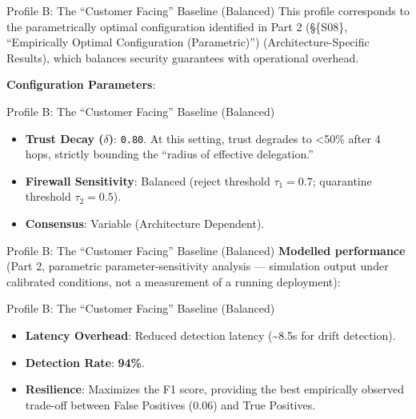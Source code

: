 \documentclass[
  ignorenonframetext,
]{beamer}
\providecommand{\tightlist}{%
  \setlength{\itemsep}{0pt}\setlength{\parskip}{0pt}}
\begin{document}
\begin{frame}{Profile B: The ``Customer
Facing'' Baseline (Balanced)}
This profile corresponds to the parametrically optimal configuration
identified in Part 2 (\S\{S08\}, ``Empirically Optimal Configuration
(Parametric)'') (Architecture-Specific Results), which balances security
guarantees with operational overhead.

\textbf{Configuration Parameters}:

\end{frame}

\begin{frame}{Profile B: The ``Customer
Facing'' Baseline (Balanced)}
\begin{itemize}
\tightlist
\item
  \textbf{Trust Decay (\(\delta\))}: \texttt{0.80}. At this setting,
  trust degrades to \textless50\% after 4 hops, strictly bounding the
  ``radius of effective delegation.''
\item
  \textbf{Firewall Sensitivity}: Balanced (reject threshold
  \(\tau_1 = 0.7\); quarantine threshold \(\tau_2 = 0.5\)).
\item
  \textbf{Consensus}: Variable (Architecture Dependent).
\end{itemize}

\end{frame}

\begin{frame}{Profile B: The ``Customer
Facing'' Baseline (Balanced)}
\textbf{Modelled performance} (Part 2, parametric parameter-sensitivity
analysis --- simulation output under calibrated conditions, not a
measurement of a running deployment):

\end{frame}

\begin{frame}{Profile B: The ``Customer
Facing'' Baseline (Balanced)}
\begin{itemize}
\tightlist
\item
  \textbf{Latency Overhead}: Reduced detection latency
  (\textasciitilde8.5s for drift detection).
\item
  \textbf{Detection Rate}: \textbf{94\%}.
\item
  \textbf{Resilience}: Maximizes the F1 score, providing the best
  empirically observed trade-off between False Positives (0.06) and True
  Positives.
\end{itemize}
\end{frame}
\end{document}
